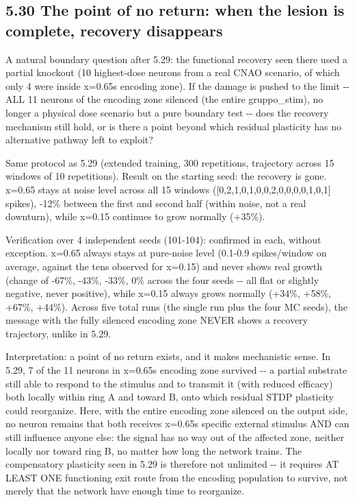 \documentclass[
  english,
]{article}
\begin{document}

\subsection{5.30 The point of no return: when the lesion is complete, recovery disappears}\label{the-point-of-no-return-when-the-lesion-is-complete-recovery-disappears}

A natural boundary question after 5.29: the functional recovery seen there used a partial knockout (10 highest-dose neurons from a real CNAO scenario, of which only 4 were inside x=0.65\textquotesingle s encoding zone). If the damage is pushed to the limit -\/- ALL 11 neurons of the encoding zone silenced (the entire gruppo\_\allowbreak{}stim), no longer a physical dose scenario but a pure boundary test -\/- does the recovery mechanism still hold, or is there a point beyond which residual plasticity has no alternative pathway left to exploit?

Same protocol as 5.29 (extended training, 300 repetitions, trajectory across 15 windows of 10 repetitions). Result on the starting seed: the recovery is gone. x=0.65 stays at noise level across all 15 windows ({[}0,2,1,0,1,0,0,2,0,0,0,0,1,0,1{]} spikes), -12\% between the first and second half (within noise, not a real downturn), while x=0.15 continues to grow normally (+35\%).

Verification over 4 independent seeds (101-104): confirmed in each, without exception. x=0.65 always stays at pure-noise level (0.1-0.9 spikes/window on average, against the tens observed for x=0.15) and never shows real growth (change of -67\%, -43\%, -33\%, 0\% across the four seeds -\/- all flat or slightly negative, never positive), while x=0.15 always grows normally (+34\%, +58\%, +67\%, +44\%). Across five total runs (the single run plus the four MC seeds), the message with the fully silenced encoding zone NEVER shows a recovery trajectory, unlike in 5.29.

Interpretation: a point of no return exists, and it makes mechanistic sense. In 5.29, 7 of the 11 neurons in x=0.65\textquotesingle s encoding zone survived -\/- a partial substrate still able to respond to the stimulus and to transmit it (with reduced efficacy) both locally within ring A and toward B, onto which residual STDP plasticity could reorganize. Here, with the entire encoding zone silenced on the output side, no neuron remains that both receives x=0.65\textquotesingle s specific external stimulus AND can still influence anyone else: the signal has no way out of the affected zone, neither locally nor toward ring B, no matter how long the network trains. The compensatory plasticity seen in 5.29 is therefore not unlimited -\/- it requires AT LEAST ONE functioning exit route from the encoding population to survive, not merely that the network have enough time to reorganize.
\end{document}
